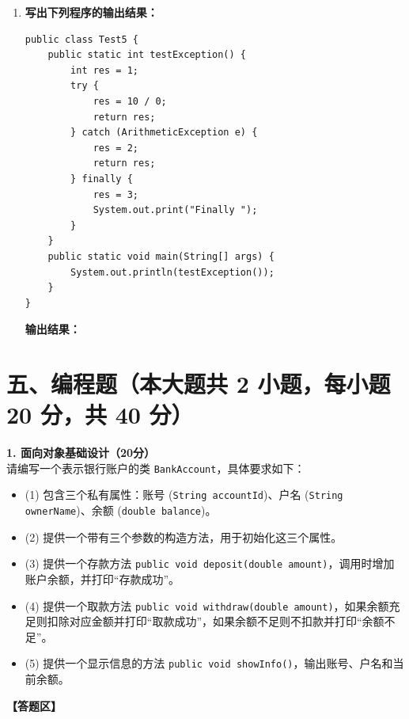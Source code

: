 \documentclass[a3paper, landscape, 11pt, twocolumn]{article}
\begin{document}
\begin{enumerate}[label=\arabic*., itemsep=1em]
	\item \textbf{写出下列程序的输出结果：}
	      \begin{lstlisting}[style=JavaExam]
public class Test5 {
    public static int testException() {
        int res = 1;
        try {
            res = 10 / 0;
            return res;
        } catch (ArithmeticException e) {
            res = 2;
            return res;
        } finally {
            res = 3;
            System.out.print("Finally ");
        }
    }
    public static void main(String[] args) {
        System.out.println(testException());
    }
}
\end{lstlisting}
	      \textbf{输出结果：}\underline{\hspace{8cm}}
\end{enumerate}

\newpage
\section*{五、编程题（本大题共 2 小题，每小题 20 分，共 40 分）}

\textbf{1. 面向对象基础设计（20分）}\\
请编写一个表示银行账户的类 \texttt{BankAccount}，具体要求如下：
\begin{itemize}
	\item (1) 包含三个私有属性：账号 (\texttt{String accountId})、户名 (\texttt{String ownerName})、余额 (\texttt{double balance})。
	\item (2) 提供一个带有三个参数的构造方法，用于初始化这三个属性。
	\item (3) 提供一个存款方法 \texttt{public void deposit(double amount)}，调用时增加账户余额，并打印“存款成功”。
	\item (4) 提供一个取款方法 \texttt{public void withdraw(double amount)}，如果余额充足则扣除对应金额并打印“取款成功”，如果余额不足则不扣款并打印“余额不足”。
	\item (5) 提供一个显示信息的方法 \texttt{public void showInfo()}，输出账号、户名和当前余额。
\end{itemize}
\vspace{1em}
\textbf{【答题区】}
\vspace{12cm}
\end{document}
